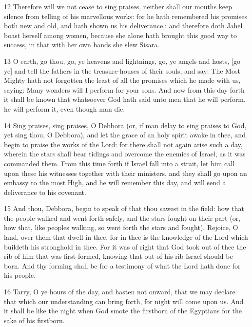 \par 12 Therefore will we not cease to sing praises, neither shall our mouths keep silence from telling of his marvellous works: for he hath remembered his promises both new and old, and hath shown us his deliverance,: and therefore doth Jahel boast herself among women, because she alone hath brought this good way to success, in that with her own hands she slew Sisara.

\par 13 O earth, go thou, go, ye heavens and lightnings, go, ye angels and hosts, [go ye] and tell the fathers in the treasure-houses of their souls, and say: The Most Mighty hath not forgotten the least of all the promises which he made with us, saying: Many wonders will I perform for your sons. And now from this day forth it shall be known that whatsoever God hath said unto men that he will perform, he will perform it, even though man die. 

\par 14 Sing praises, sing praises, O Debbora (or, if man delay to sing praises to God, yet sing thou, O Debbora), and let the grace of an holy spirit awake in thee, and begin to praise the works of the Lord: for there shall not again arise such a day, wherein the stars shall bear tidings and overcome the enemies of Israel, as it was commanded them. From this time forth if Israel fall into a strait, let him call upon these his witnesses together with their ministers, and they shall go upon an embassy to the most High, and he will remember this day, and will send a deliverance to his covenant. 

\par 15 And thou, Debbora, begin to speak of that thou sawest in the field: how that the people walked and went forth safely, and the stars fought on their part (or, how that, like peoples walking, so went forth the stars and fought). Rejoice, O land, over them that dwell in thee, for in thee is the knowledge of the Lord which buildeth his stronghold in thee. For it was of right that God took out of thee the rib of him that was first formed, knowing that out of his rib Israel should be born. And thy forming shall be for a testimony of what the Lord hath done for his people.

\par 16 Tarry, O ye hours of the day, and hasten not onward, that we may declare that which our understanding can bring forth, for night will come upon us. And it shall be like the night when God smote the firstborn of the Egyptians for the sake of his firstborn. 

